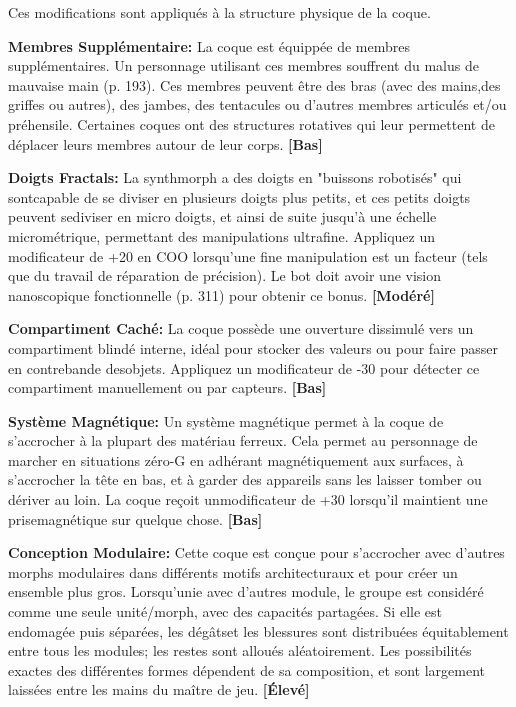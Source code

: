 Ces modifications sont appliqués à la structure physique de la coque. 

\textbf{Membres Supplémentaire:} La coque est équippée de membres supplémentaires. Un personnage utilisant ces membres souffrent du malus de mauvaise main (p. 193). Ces membres peuvent être des bras (avec des mains,des griffes ou autres), des jambes, des tentacules ou d'autres membres articulés et/ou préhensile. Certaines coques ont des structures rotatives qui leur permettent de déplacer leurs membres autour de leur corps. \textbf{[Bas]} 

\textbf{Doigts Fractals:} La synthmorph a des doigts en "buissons robotisés" qui sontcapable de se diviser en plusieurs doigts plus petits, et ces petits doigts peuvent sediviser en micro doigts, et ainsi de suite jusqu'à une échelle micrométrique, permettant des manipulations ultrafine. Appliquez un modificateur de +20 en COO lorsqu'une fine manipulation est un facteur (tels que du travail de réparation de précision). Le bot doit avoir une vision nanoscopique fonctionnelle (p. 311) pour obtenir ce bonus. \textbf{[Modéré]} 

\textbf{Compartiment Caché:} La coque possède une ouverture dissimulé vers un compartiment blindé interne, idéal pour stocker des valeurs ou pour faire passer en contrebande desobjets. Appliquez un modificateur de -30 pour détecter ce compartiment manuellement ou par capteurs. \textbf{[Bas]} 

\textbf{Système Magnétique:} Un système magnétique permet à la coque de s'accrocher à la plupart des matériau ferreux. Cela permet au personnage de marcher en situations zéro-G en adhérant magnétiquement aux surfaces, à s'accrocher la tête en bas, et à garder des appareils sans les laisser tomber ou dériver au loin. La coque reçoit unmodificateur de +30 lorsqu'il maintient une prisemagnétique sur quelque chose. \textbf{[Bas]} 

\textbf{Conception Modulaire:} Cette coque est conçue pour s'accrocher avec d'autres morphs modulaires dans différents motifs architecturaux et pour créer un ensemble plus gros. Lorsqu'unie avec d'autres module, le groupe est considéré comme une seule unité/morph, avec des capacités partagées. Si elle est endomagée puis séparées, les dégâtset les blessures sont distribuées équitablement entre tous les modules; les restes sont alloués aléatoirement. Les possibilités exactes des différentes formes dépendent de sa composition, et sont largement laissées entre les mains du maître de jeu. \textbf{[Élevé]} 

